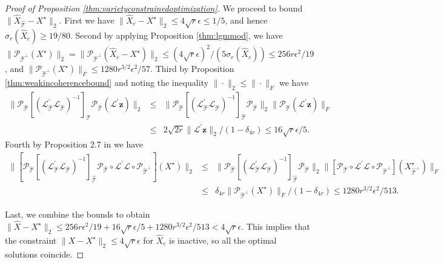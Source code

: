 \documentclass[11pt,letterpaper]{article}
\newcommand{\bz}{\mathbf{z}}
\newcommand{\ct}{\mathcal{T}}
\newcommand{\cp}{\mathcal{P}}
\begin{document}
\begin{proof}[Proof of Proposition \ref{thm:varietyconstrainedoptimization}]
	We proceed to bound $\| \hat{X}_{\hat{\ct}} - X^{\star}\|_2$.
	First we have $\| \hat{X}_{c} - X^{\star}\|_2 \leq 4 \sqrt{r} \epsilon \leq 1/5$, and hence $\sigma_r (\hat{X}_c) \geq 19/80$. Second by applying Proposition \ref{thm:lgmmod}, we have $\| \cp_{\hat{\ct}^{\perp}} (X^{\star}) \|_2 = \| \cp_{\hat{\ct}^{\perp}} (\hat{X}_c - X^{\star}) \|_2 \leq (4 \sqrt{r} \epsilon)^2 / (5 \sigma_r (\hat{X}_c)) \leq 256 r \epsilon^2/19$, and $\|\cp_{\hat{\ct}^{\perp}} (X^{\star})\|_F \leq 1280 r^{3/2} \epsilon^2 / 57$. Third by Proposition \ref{thm:weakincoherencebound} and noting the inequality $\|\cdot\|_2 \leq \|\cdot\|_F$ we have 
	\begin{eqnarray*}
		\| \cp_{\hat{\ct}} [(\mathcal{L}^{\prime}_{\hat{\ct}}\mathcal{L}_{\hat{\ct}})^{-1}]_{\hat{\ct}} \cp_{\hat{\ct}} (\mathcal{L}^{\prime} \bz) \|_2 & \leq & \| \cp_{\hat{\ct}} [(\mathcal{L}^{\prime}_{\hat{\ct}}\mathcal{L}_{\hat{\ct}})^{-1}]_{\hat{\ct}} \cp_{\hat{\ct}} \|_{2} \| \cp_{\hat{\ct}}(\mathcal{L}^{\prime} \bz) \|_F \\
		& \leq & 2\sqrt{2r}\| \mathcal{L}^{\prime} \bz \|_2 /(1 - \delta_{4r}) \leq 16\sqrt{r} \epsilon/5.
	\end{eqnarray*}
	Fourth by Proposition 2.7 in \cite{GM:11} we have 
	\begin{eqnarray*}
		\| [\cp_{\hat{\ct}} [(\mathcal{L}^{\prime}_{\hat{\ct}}\mathcal{L}_{\hat{\ct}})^{-1}]_{\hat{\ct}} \cp_{\hat{\ct}} \circ \mathcal{L}^{\prime} \mathcal{L} \circ \cp_{\hat{\ct}^{\perp}}]  (X^{\star}) \|_{2} & \leq &  \| \cp_{\hat{\ct}} [(\mathcal{L}^{\prime}_{\hat{\ct}}\mathcal{L}_{\hat{\ct}})^{-1}]_{\hat{\ct}} \cp_{\hat{\ct}} \|_{2}  \| [\cp_{\hat{\ct}} \circ \mathcal{L}^{\prime} \mathcal{L} \circ \cp_{\hat{\ct}^{\perp}}] (X^{\star}_{\hat{\ct}^{\perp}}) \|_{F} \\
		& \leq & \delta_{4r} \|\cp_{\hat{\ct}^{\perp}}(X^{\star})\|_F /(1 - \delta_{4r}) \leq 1280r^{3/2} \epsilon^2/513 .
	\end{eqnarray*}
	
	
	
	Last, we combine the bounds to obtain $\| \hat{X} - X^{\star} \|_2 \leq 256 r \epsilon^2 / 19 + 16 \sqrt{r} \epsilon/5 + 1280 r^{3/2} \epsilon^2 / 513 < 4 \sqrt{r} \epsilon $. This implies that the constraint $\| X - X^{\star} \|_2 \leq 4 \sqrt{r} \epsilon$ for $\hat{X}_c$ is inactive, so all the optimal solutions coincide.
	

\end{proof}
\end{document}
